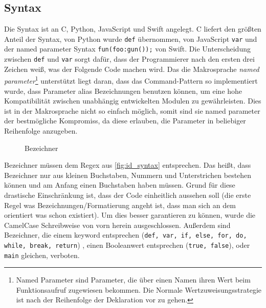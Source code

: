   \subsection{Syntax}
  \label{ssec:Syntax}
    Die Syntax ist an C, Python, JavaScript und Swift angelegt. C liefert den größten Anteil der Syntax, von Python wurde \lstinline[style=MyMacroStyle]$def$ übernommen, von JavaScript \lstinline[style=MyMacroStyle]$var$ und der named parameter Syntax \lstinline[style=MyMacroStyle]$fun(foo:gun());$ von Swift. Die Unterscheidung zwischen \lstinline[style=MyMacroStyle]$def$ und \lstinline[style=MyMacroStyle]$var$ sorgt dafür, dass der Programmierer nach den ersten drei Zeichen weiß, was der Folgende Code machen wird. Das die Makrosprache \emph{named parameter}\footnote{
      Named Parameter sind Parameter, die über einen Namen ihren Wert beim Funktionsaufruf zugewiesen bekommen. Die Normale Wertzuweisungsstrategie ist nach der Reihenfolge der Deklaration vor zu gehen.
    } unterstützt liegt daran, dass das Command-Pattern so implementiert wurde, dass Parameter alias Bezeichnungen benutzen können, um eine hohe Kompatibilität zwischen unabhängig entwickelten Modulen zu gewährleisten. Dies ist in der Makrosprache nicht so einfach möglich, somit sind sie named parameter der bestmögliche Kompromiss, da diese erlauben, die Parameter in beliebiger Reihenfolge anzugeben.

    \begin{figure}[H]
      \centering
      \caption{Bezeichner}
      \label{fig:id_syntax}
    \end{figure}
    Bezeichner müssen dem Regex aus \autoref{fig:id_syntax} entsprechen. Das heißt, dass Bezeichner nur aus kleinen Buchstaben, Nummern und Unterstrichen bestehen können und am Anfang einen Buchstaben haben müssen. Grund für diese drastische Einschränkung ist, dass der Code einheitlich aussehen soll (die erste Regel was Bezeichnungen/Formatierung angeht ist, dass man sich an dem orientiert was schon existiert). Um dies besser garantieren zu können, wurde die CamelCase Schreibweise von vorn herein ausgeschlossen. Außerdem sind Bezeichner, die einem keyword entsprechen (\lstinline[style=MyMacroStyle]$def, var, if, else, for, do, while, break, return$)
    , einen Booleanwert entsprechen (\lstinline[style=MyMacroStyle]$true, false$), oder \lstinline[style=MyMacroStyle]$main$ gleichen, verboten.

